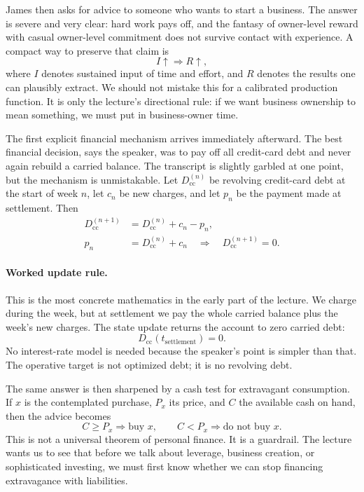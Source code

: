 James then asks for advice to someone who wants to start a business. The answer is severe and very clear: hard work pays off, and the fantasy of owner-level reward with casual owner-level commitment does not survive contact with experience. A compact way to preserve that claim is
\begin{equation}
I \uparrow \Longrightarrow R \uparrow,
\end{equation}
where \(I\) denotes sustained input of time and effort, and \(R\) denotes the results one can plausibly extract. We should not mistake this for a calibrated production function. It is only the lecture's directional rule: if we want business ownership to mean something, we must put in business-owner time.

The first explicit financial mechanism arrives immediately afterward. The best financial decision, says the speaker, was to pay off all credit-card debt and never again rebuild a carried balance. The transcript is slightly garbled at one point, but the mechanism is unmistakable. Let \(D_{\mathrm{cc}}^{(n)}\) be revolving credit-card debt at the start of week \(n\), let \(c_n\) be new charges, and let \(p_n\) be the payment made at settlement. Then
\begin{align}
D_{\mathrm{cc}}^{(n+1)} &= D_{\mathrm{cc}}^{(n)} + c_n - p_n, \\
p_n &= D_{\mathrm{cc}}^{(n)} + c_n
\quad \Longrightarrow \quad
D_{\mathrm{cc}}^{(n+1)} = 0.
\end{align}

\paragraph{Worked update rule.}
This is the most concrete mathematics in the early part of the lecture. We charge during the week, but at settlement we pay the whole carried balance plus the week's new charges. The state update returns the account to zero carried debt:
\begin{equation}
D_{\mathrm{cc}}(t_{\mathrm{settlement}})=0.
\end{equation}
No interest-rate model is needed because the speaker's point is simpler than that. The operative target is not optimized debt; it is no revolving debt.

The same answer is then sharpened by a cash test for extravagant consumption. If \(x\) is the contemplated purchase, \(P_x\) its price, and \(C\) the available cash on hand, then the advice becomes
\begin{equation}
C \ge P_x \Rightarrow \text{buy }x,
\qquad
C < P_x \Rightarrow \text{do not buy }x.
\end{equation}
This is not a universal theorem of personal finance. It is a guardrail. The lecture wants us to see that before we talk about leverage, business creation, or sophisticated investing, we must first know whether we can stop financing extravagance with liabilities.

